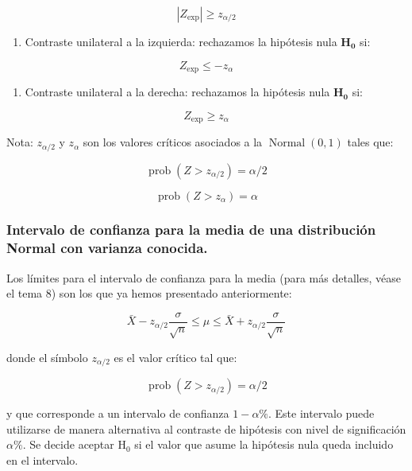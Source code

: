 \documentclass[
]{article}
\providecommand{\tightlist}{%
  \setlength{\itemsep}{0pt}\setlength{\parskip}{0pt}}
\begin{document}
\[
\left|Z_{\exp }\right| \geq z_{\alpha / 2}
\]

\begin{enumerate}
\def\labelenumi{\alph{enumi})}
\setcounter{enumi}{1}
\tightlist
\item
  Contraste unilateral a la izquierda: rechazamos la hipótesis nula \(\mathbf{H}_{\mathbf{0}}\) si:
\end{enumerate}

\[
Z_{\exp } \leq-z_{\alpha}
\]

\begin{enumerate}
\def\labelenumi{\alph{enumi})}
\setcounter{enumi}{2}
\tightlist
\item
  Contraste unilateral a la derecha: rechazamos la hipótesis nula \(\mathbf{H}_{\mathbf{0}}\) si:
\end{enumerate}

\[
Z_{\exp } \geq z_{\alpha}
\]

Nota: \(z_{\alpha / 2}\) y \(z_{\alpha}\) son los valores críticos asociados a la \(\operatorname{Normal}(0,1)\) tales que:

\[
\operatorname{prob}\left(Z>z_{\alpha / 2}\right)=\alpha / 2
\]

\[
\operatorname{prob}\left(Z>z_{\alpha}\right)=\alpha
\]

\subsubsection{Intervalo de confianza para la media de una distribución Normal con varianza conocida.}\label{intervalo-de-confianza-para-la-media-de-una-distribuciuxf3n-normal-con-varianza-conocida.}

Los límites para el intervalo de confianza para la media (para más detalles, véase el tema 8) son los que ya hemos presentado anteriormente:

\[
\bar{X}-z_{\alpha / 2} \frac{\sigma}{\sqrt{n}} \leq \mu \leq \bar{X}+z_{\alpha / 2} \frac{\sigma}{\sqrt{n}}
\]

donde el símbolo \(z_{\alpha / 2}\) es el valor crítico tal que:

\[
\operatorname{prob}\left(Z>z_{\alpha / 2}\right)=\alpha / 2
\]

y que corresponde a un intervalo de confianza \(1-\alpha \%\). Este intervalo puede utilizarse de manera alternativa al contraste de hipótesis con nivel de significación \(\alpha \%\). Se decide aceptar \(\mathrm{H}_{0}\) si el valor que asume la hipótesis nula queda incluido en el intervalo.
\end{document}
